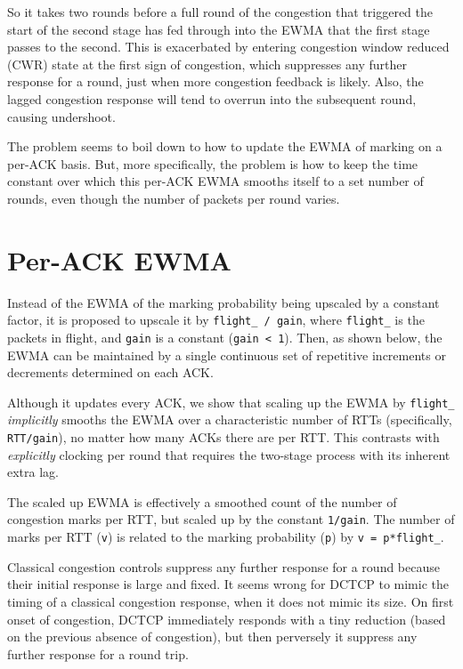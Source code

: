 So it takes two rounds before a full round of the congestion that triggered the
start of the second stage has fed through into the EWMA that the first stage
passes to the second. This is exacerbated by entering congestion window
reduced (CWR) state at the first sign of congestion,
which suppresses any further response for a round, just when more congestion
feedback is likely. Also, the lagged congestion response will tend to overrun into
the subsequent round, causing undershoot.

The problem seems to boil down to how to update the EWMA of marking on a per-ACK
basis. But, more specifically, the problem is how to keep the time
constant over which this per-ACK EWMA smooths itself to a set number of
rounds, even though the number of packets per round varies.

\section{Per-ACK EWMA}\label{prresp_Per-Packet_EWMA}

Instead of the EWMA of the marking probability being upscaled by a constant
factor, it is proposed to upscale it by \texttt{flight\_ / gain}, where
\texttt{flight\_} is the packets in flight, and \texttt{gain} is a constant
(\texttt{gain < 1}). Then, as shown below, the EWMA can be maintained by a
single continuous set of repetitive increments or decrements determined on each
ACK.

Although it updates every ACK, we show that scaling up the EWMA by
\texttt{flight\_} \emph{implicitly} smooths the EWMA over a characteristic
number of RTTs (specifically, \texttt{RTT/gain}), no matter how many ACKs there
are per RTT. This contrasts with \emph{explicitly} clocking per
round that requires the two-stage process with its inherent extra lag.

The scaled up EWMA is effectively a smoothed count of the number of congestion
marks per RTT, but scaled up by the constant \texttt{1/gain}. The number of
marks per RTT (\texttt{v}) is related to the marking probability (\texttt{p}) by
\texttt{v = p*flight\_}.

Classical congestion controls suppress any further response for a round because
their initial response is large and fixed. It seems wrong for DCTCP to mimic the
timing of a classical congestion response, when it does not mimic its size. On
first onset of congestion, DCTCP immediately responds with a tiny reduction
(based on the previous absence of congestion), but then perversely it suppress
any further response for a round trip.

